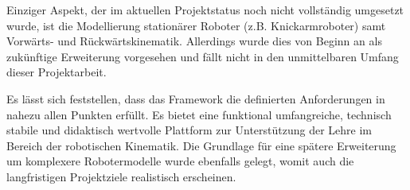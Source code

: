 Einziger Aspekt, der im aktuellen Projektstatus noch nicht vollständig umgesetzt wurde,
ist die Modellierung stationärer Roboter (z.B. Knickarmroboter) samt Vorwärts- und Rückwärtskinematik.
Allerdings wurde dies von Beginn an als zukünftige Erweiterung vorgesehen und fällt nicht in den unmittelbaren Umfang dieser Projektarbeit.

Es lässt sich feststellen, dass das Framework die definierten Anforderungen in nahezu allen Punkten erfüllt.
Es bietet eine funktional umfangreiche, technisch stabile und didaktisch wertvolle Plattform zur Unterstützung der Lehre im Bereich der robotischen Kinematik.
Die Grundlage für eine spätere Erweiterung um komplexere Robotermodelle wurde ebenfalls gelegt, womit auch die langfristigen Projektziele realistisch erscheinen.